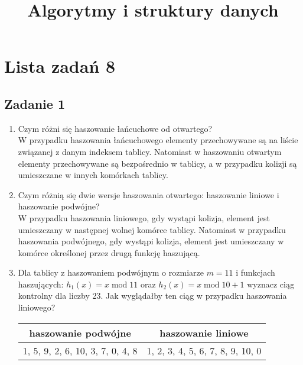 \documentclass{article}
\begin{document}
\title{Algorytmy i struktury danych}
\author{}
\date{}
\maketitle

\section*{Lista zadań 8}

\subsection*{Zadanie 1}
\begin{enumerate}[label=(\alph*)]
    \item Czym różni się haszowanie łańcuchowe od otwartego? \\[1ex]
          W przypadku haszowania łańcuchowego elementy przechowywane są na liście związanej z danym indeksem tablicy.
          Natomiast w haszowaniu otwartym elementy przechowywane są bezpośrednio w tablicy, a w przypadku kolizji
          są umieszczane w innych komórkach tablicy.
    \item Czym różnią się dwie wersje haszowania otwartego: haszowanie liniowe i haszowanie podwójne? \\[1ex]
          W przypadku haszowania liniowego, gdy wystąpi kolizja, element jest umieszczany w następnej wolnej komórce
          tablicy. Natomiast w przypadku haszowania podwójnego, gdy wystąpi kolizja, element jest umieszczany w komórce
          określonej przez drugą funkcję haszującą.
    \item Dla tablicy z haszowaniem podwójnym o rozmiarze $m=11$ i funkcjach haszujących:
          $h_1(x)=x \mathop{\mathrm{mod}} 11$  oraz $h_2(x)= x \mathop{\mathrm{mod}} 10+1$ wyznacz ciąg kontrolny
          dla liczby 23. Jak wyglądałby ten ciąg w przypadku haszowania liniowego?
          \begin{center}
              \begin{tabular}{c | c}
                  \textbf{haszowanie podwójne}     & \textbf{haszowanie liniowe}      \\
                  \hline
                  1, 5, 9, 2, 6, 10, 3, 7, 0, 4, 8 & 1, 2, 3, 4, 5, 6, 7, 8, 9, 10, 0
              \end{tabular}
          \end{center}
\end{enumerate}
\end{document}
